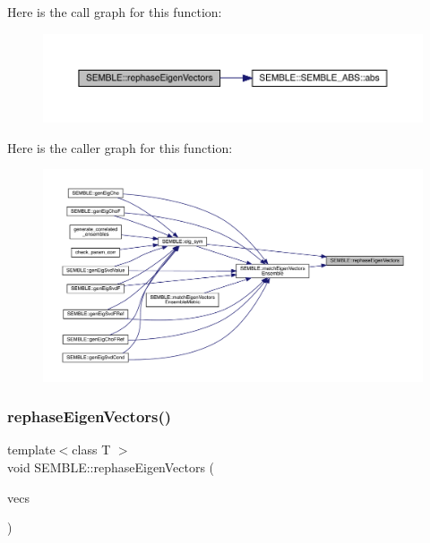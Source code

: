 Here is the call graph for this function\+:
\nopagebreak
\begin{figure}[H]
\begin{center}
\leavevmode
\includegraphics[width=350pt]{d7/dfd/namespaceSEMBLE_a79d0a2c210a96269ba9cf04949eba1b8_cgraph}
\end{center}
\end{figure}
Here is the caller graph for this function\+:
\nopagebreak
\begin{figure}[H]
\begin{center}
\leavevmode
\includegraphics[width=350pt]{d7/dfd/namespaceSEMBLE_a79d0a2c210a96269ba9cf04949eba1b8_icgraph}
\end{center}
\end{figure}
\mbox{\label{namespaceSEMBLE_ab6128a994eb0c94caa8452dfd476553f}} 
\subsubsection{\texorpdfstring{rephaseEigenVectors()}{rephaseEigenVectors()}\hspace{0.1cm}{\footnotesize\ttfamily [2/2]}}
{\footnotesize\ttfamily template$<$class T $>$ \\
void S\+E\+M\+B\+L\+E\+::rephase\+Eigen\+Vectors (\begin{DoxyParamCaption}\item[{\mbox{\hyperlink{structSEMBLE_1_1SembleMatrix}{Semble\+Matrix}}$<$ T $>$ \&}]{vecs }\end{DoxyParamCaption})}

